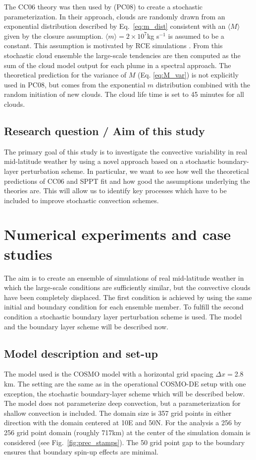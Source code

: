 \documentclass[a4paper, 12pt]{article}
\begin{document}
The CC06 theory was then used by \cite{Plant2008}(PC08) to create a stochastic parameterization. In their approach, clouds are randomly drawn from an exponential distribution described by Eq.~\ref{eq:m_dist} consistent with an $\langle M \rangle$ given by the closure assumption. $\langle m \rangle = 2 \times 10^7$kg s$^{-1}$ is assumed to be a constant. This assumption is motivated by RCE simulations \citep[e.g.][]{Cohen2006}. From this stochastic cloud ensemble the large-scale tendencies are then computed as the sum of the cloud model output for each plume in a spectral approach. The theoretical prediction for the variance of $M$ (Eq. \ref{eq:M_var}) is not explicitly used in PC08, but comes from the exponential $m$ distribution combined with the random initiation of new clouds. The cloud life time is set to 45 minutes for all clouds. 

\subsection{Research question / Aim of this study}

The primary goal of this study is to investigate the convective variability in real mid-latitude weather by using a novel approach based on a stochastic boundary-layer perturbation scheme. In particular, we want to see how well the theoretical predictions of CC06 and SPPT fit and how good the assumptions underlying the theories are. This will allow us to identify key processes which have to be included to improve stochastic convection schemes. 


\section{Numerical experiments and case studies} \label{sec:numerical}
The aim is to create an ensemble of simulations of real mid-latitude weather in which the large-scale conditions are sufficiently similar, but the convective clouds have been completely displaced. The first condition is achieved by using the same initial and boundary condition for each ensemble member. To fulfill the second condition a stochastic boundary layer perturbation scheme is used. The model and the boundary layer scheme will be described now. 

\subsection{Model description and set-up}
The model used is the COSMO model \citep{Baldauf2011} with a horizontal grid spacing $\Delta x=$2.8\,km. The setting are the same as in the operational COSMO-DE setup with one exception, the stochastic boundary-layer scheme which will be described below. The model does not parameterize deep convection, but a parameterization for shallow convection is included. The domain size is 357 grid points in either direction with the domain centered at 10E and 50N. For the analysis a 256 by 256 grid point domain (roughly 717km) at the center of the simulation domain is considered (see Fig.~\ref{fig:prec_stamps}). The 50 grid point gap to the boundary ensures that boundary spin-up effects are minimal. 
\end{document}
